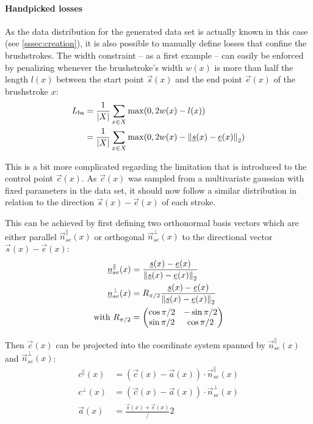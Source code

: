 \paragraph{Handpicked losses} As the data distribution for the generated data set is actually known in this case (see \ref{sssec:creation}), it is also possible to manually define losses that confine the brushstrokes.
The width constraint -- as a first example -- can easily be enforced by penalizing whenever the brushstroke's width $w(x)$ is more than half the length $l(x)$ between the start point $\vec{s}(x)$ and the end point $\vec{e}(x)$ of the brushstroke $x$:
\begin{align}
    L_{\text{bs}} & = \frac{1}{\vert X \vert}\sum_{x \in X} \max(0, 2w(x) - l(x)) \\
    & = \frac{1}{\vert X \vert}\sum_{x \in X} \max(0, 2w(x) - \left\lVert\underline s(x) - \underline e(x)\right\rVert_2)
\end{align}

This is a bit more complicated regarding the limitation that is introduced to the control point $\vec{c}(x)$.
As $\vec{c}(x)$ was sampled from a multivariate gaussian with fixed parameters in the data set, it should now follow a similar distribution in relation to the direction $\vec{s}(x) - \vec{e}(x)$ of each stroke.

This can be achieved by first defining two orthonormal basis vectors which are either parallel $\vec{n}_{se}^\parallel(x)$ or orthogonal $\vec{n}_{se}^\bot(x)$ to the directional vector $\vec{s}(x) - \vec{e}(x)$:
\begin{align}
    \underline n_{se}^\parallel(x) & = \frac{\underline s(x) - \underline e(x)}{\left\lVert\underline s(x) - \underline e(x)\right\rVert_2} \\
    \underline n_{se}^\bot(x) & = R_{\pi/2} \frac{\underline s(x) - \underline e(x)}{\left\lVert\underline s(x) - \underline e(x)\right\rVert_2} \\
    \text{with } R_{\pi/2} & =
    \begin{pmatrix}
        \cos \pi/2 & -\sin \pi/2 \\
        \sin \pi/2 & \cos \pi/2
    \end{pmatrix}
\end{align}

Then $\vec{c}(x)$ can be projected into the coordinate system spanned by  $\vec{n}_{se}^\parallel(x)$ and $\vec{n}_{se}^\bot(x)$:
\begin{align}
    c^\parallel(x) & = (\vec{c}(x) - \vec{a}(x)) \cdot \vec{n}_{se}^\parallel(x)  \\
    c^\bot(x) & = (\vec{c}(x) - \vec{a}(x)) \cdot \vec{n}_{se}^\bot(x)  \\
    \vec{a}(x) & = \frac{\vec{s}(x) + \vec{e}(x)}/2
\end{align}

